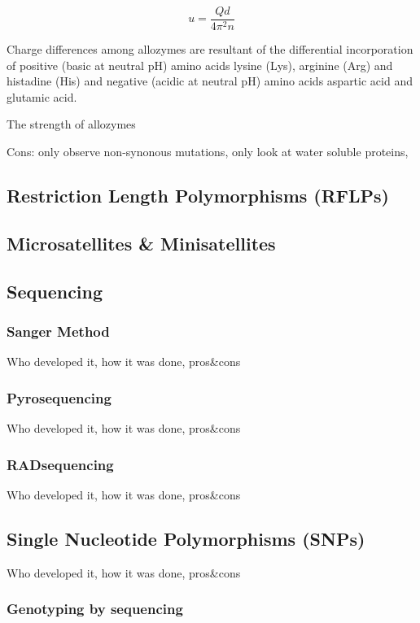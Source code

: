 \documentclass[11pt, oneside]{article}
\begin{document}
\begin{equation*}
u=\frac{Qd}{4\pi^2n}
\end{equation*}

Charge differences among allozymes are resultant of the 
differential incorporation of positive (basic at neutral pH) amino acids lysine (Lys), arginine (Arg) and 
histadine (His) and negative (acidic at neutral pH) amino acids aspartic acid and glutamic acid. 

The strength of allozymes 


Cons: only observe non-synonous mutations, only look at water soluble proteins, 
\subsection{Restriction Length Polymorphisms (RFLPs)}


\subsection{Microsatellites \& Minisatellites}

\subsection{Sequencing}
\subsubsection{Sanger Method}
Who developed it, how it was done, pros\&cons
\subsubsection{Pyrosequencing}
Who developed it, how it was done, pros\&cons
\subsubsection{RADsequencing}
Who developed it, how it was done, pros\&cons

\subsection{Single Nucleotide Polymorphisms (SNPs)}
Who developed it, how it was done, pros\&cons
\subsubsection{Genotyping by sequencing}
\end{document}
